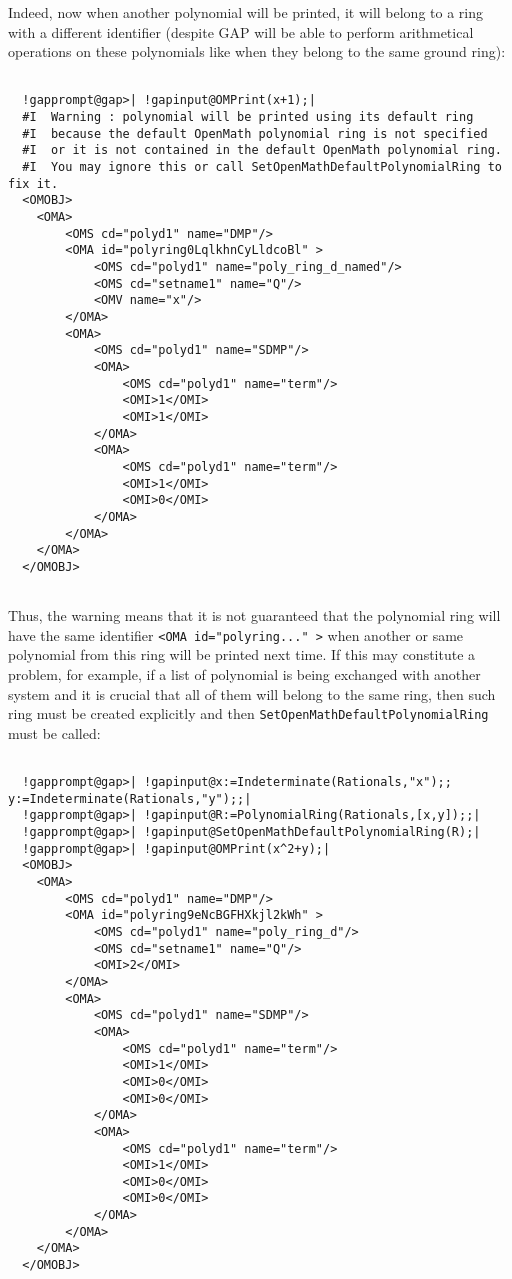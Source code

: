 \documentclass[a4paper,11pt]{report}
\begin{document}
{{\begin{Verbatim}[commandchars=!@|,fontsize=\small,frame=single,label=Example]
\end{Verbatim}
 Indeed, now when another polynomial will be printed, it will belong to a ring
with a different identifier (despite \textsf{GAP} will be able to perform arithmetical operations on these polynomials like when
they belong to the same ground ring): 
\begin{Verbatim}[commandchars=!@|,fontsize=\small,frame=single,label=Example]
  
  !gapprompt@gap>| !gapinput@OMPrint(x+1);|
  #I  Warning : polynomial will be printed using its default ring 
  #I  because the default OpenMath polynomial ring is not specified 
  #I  or it is not contained in the default OpenMath polynomial ring.
  #I  You may ignore this or call SetOpenMathDefaultPolynomialRing to fix it.
  <OMOBJ>
  	<OMA>
  		<OMS cd="polyd1" name="DMP"/>
  		<OMA id="polyring0LqlkhnCyLldcoBl" >
  			<OMS cd="polyd1" name="poly_ring_d_named"/>
  			<OMS cd="setname1" name="Q"/>
  			<OMV name="x"/>
  		</OMA>
  		<OMA>
  			<OMS cd="polyd1" name="SDMP"/>
  			<OMA>
  				<OMS cd="polyd1" name="term"/>
  				<OMI>1</OMI>
  				<OMI>1</OMI>
  			</OMA>
  			<OMA>
  				<OMS cd="polyd1" name="term"/>
  				<OMI>1</OMI>
  				<OMI>0</OMI>
  			</OMA>
  		</OMA>
  	</OMA>
  </OMOBJ>
  
\end{Verbatim}
 Thus, the warning means that it is not guaranteed that the polynomial ring
will have the same identifier \texttt{{\textless}OMA id="polyring..." {\textgreater}} when another or same polynomial from this ring will be printed next time. If
this may constitute a problem, for example, if a list of polynomial is being
exchanged with another system and it is crucial that all of them will belong
to the same ring, then such ring must be created explicitly and then \texttt{SetOpenMathDefaultPolynomialRing} must be called: 
\begin{Verbatim}[commandchars=!@|,fontsize=\small,frame=single,label=Example]
  
  !gapprompt@gap>| !gapinput@x:=Indeterminate(Rationals,"x");; y:=Indeterminate(Rationals,"y");;|
  !gapprompt@gap>| !gapinput@R:=PolynomialRing(Rationals,[x,y]);;|
  !gapprompt@gap>| !gapinput@SetOpenMathDefaultPolynomialRing(R);|
  !gapprompt@gap>| !gapinput@OMPrint(x^2+y);|
  <OMOBJ>
  	<OMA>
  		<OMS cd="polyd1" name="DMP"/>
  		<OMA id="polyring9eNcBGFHXkjl2kWh" >
  			<OMS cd="polyd1" name="poly_ring_d"/>
  			<OMS cd="setname1" name="Q"/>
  			<OMI>2</OMI>
  		</OMA>
  		<OMA>
  			<OMS cd="polyd1" name="SDMP"/>
  			<OMA>
  				<OMS cd="polyd1" name="term"/>
  				<OMI>1</OMI>
  				<OMI>0</OMI>
  				<OMI>0</OMI>
  			</OMA>
  			<OMA>
  				<OMS cd="polyd1" name="term"/>
  				<OMI>1</OMI>
  				<OMI>0</OMI>
  				<OMI>0</OMI>
  			</OMA>
  		</OMA>
  	</OMA>
  </OMOBJ>
  

\end{Verbatim}}}
\end{document}
